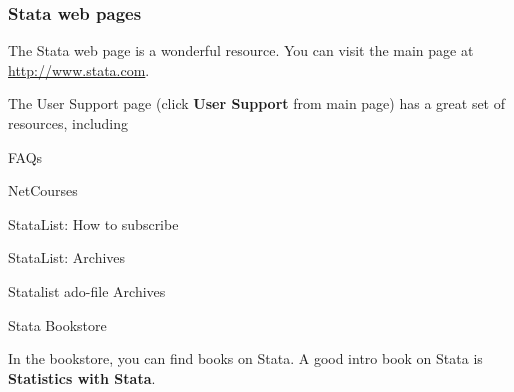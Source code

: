 \subsubsection{Stata web pages}
The Stata web page is a wonderful resource. You can visit the main page at \href{http://www.stata.com}{http://www.stata.com}.

The User Support page (click \textbf{User Support} from main page) has a great set of resources, including
\begin{compactitem}
\item FAQs
\item NetCourses
\item StataList: How to subscribe
\item StataList: Archives
\item Statalist ado-file Archives
\item Stata Bookstore
\end{compactitem}

In the bookstore, you can find books on Stata. A good intro book on Stata is \textbf{Statistics with Stata}.
